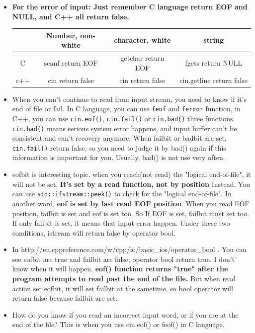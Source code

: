 \documentclass[a4paper,11pt,twoside]{book}
\newcommand{\tophline}{\hline }
\newcommand{\bottomhline}{\\ \hline }
\newcommand{\tophline}{ }
\newcommand{\bottomhline}{ }
\begin{document}
\begin{itemize}
	\item \textbf{For the error of input: Just remember C language return EOF and NULL, and C++ all return false. }
	
	\begin{tabular}{|c|c|c|c|}
		\tophline
		& Number, non-white & character, white  & string \\
		\tophline
		C & scanf return EOF & getchar return EOF & fgets return NULL \\
		\tophline
		c++ & cin return false & cin return false & cin.getline return false \bottomhline
	\end{tabular}
	
	\item When you can't continue to read from input stream, you need to know if it's end of file or fail. In C language, you can use \texttt{feof} and \texttt{ferror} function, in C++, you can use \texttt{cin.eof()}, \texttt{cin.fail()} or \texttt{cin.bad()} three functions. \texttt{cin.bad()} means serious system error happens, and input buffer can't be consistent and can't recovery anymore.  When failbit or badbit are set, \texttt{cin.fail()} return false, so you need to judge it by bad() again if this information is important for you.  Usually, bad() is not use very often.
	
	\item eofbit is interesting topic. when you reach(not read) the "logical end-of-file", it will not be set, \textbf{It's set by a read function, not by position}   Instead,  You can use \texttt{std::ifstream::peek()} to check for the "logical end-of-file". In another word, \textbf{eof is set by last read EOF position}. When you read EOF position, failbit is set and eof is set too. So If EOF is set, failbit must set too.  If only failbit is set, it means that input error happen.  Under these two conditions, istream will return false by operator bool.
	
	\item In http://en.cppreference.com/w/cpp/io/basic\_ios/operator\_bool . You can see eofbit are true and failbit are false, operator bool return true. I don't' know when it will happen. \textbf{ eof() function returns "true" after the program attempts to read past the end of the file.}  But when read action set eofbit, it will set failbit at the sametime, so bool operator will return false because failbit are set.
	
	\item How do you know if you read an incorrect input word, or if you are at the end of the file? This is when you use cin.eof() or feof() in C language.
	

\end{itemize}
\end{document}

